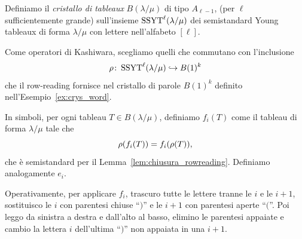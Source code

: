 \begin{definition}
    Definiamo il \emph{cristallo di tableaux} $B(\lambda / \mu)$ di tipo $A_{\ell-1}$,
    (per $\ell$ sufficientemente grande) 
    sull'insieme $\operatorname{SSYT}^\ell(\lambda/\mu)$ dei
    semistandard Young tableaux di forma $\lambda / \mu$
    con lettere nell'alfabeto $[\ell]$.

    Come operatori di Kashiwara, scegliamo quelli che commutano con l'inclusione
    \[
        \operatorname{\rho} \colon \operatorname{SSYT}^\ell(\lambda/\mu) 
        \hookrightarrow B(1)^k
    \]
    che il row-reading fornisce nel cristallo di parole $B(1)^k$ definito 
    nell'Esempio~\ref{ex:crys_word}.

    In simboli, per ogni tableau $T \in B(\lambda / \mu)$, definiamo $f_i(T)$ come
    il tableau di forma $\lambda / \mu$ tale che 
    \[
        \operatorname{\rho}(f_i ( T)) = f_i ( \operatorname{\rho} ( T)),
    \]
    che \`e semistandard per il Lemma~\ref{lem:chiusura_rowreading}.
    Definiamo analogamente $e_i$.

    Operativamente, per applicare $f_i$, trascuro tutte le lettere tranne le $i$
    e le $i+1$, sostituisco le $i$ con parentesi chiuse ``$)$'' e le $i+1$
    con parentesi aperte ``$\lparen$''.
    Poi leggo da sinistra a destra e dall'alto al basso, elimino le parentesi
    appaiate e cambio la lettera $i$ dell'ultima ``$)$'' non appaiata in una $i+1$.
\end{definition}

